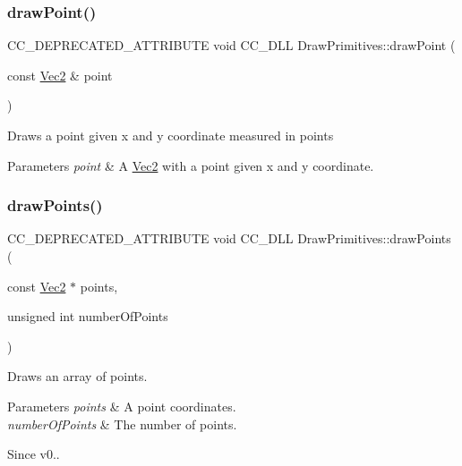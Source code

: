 \subsubsection{\texorpdfstring{draw\+Point()}{drawPoint()}}
{\footnotesize\ttfamily C\+C\+\_\+\+D\+E\+P\+R\+E\+C\+A\+T\+E\+D\+\_\+\+A\+T\+T\+R\+I\+B\+U\+TE void C\+C\+\_\+\+D\+LL Draw\+Primitives\+::draw\+Point (\begin{DoxyParamCaption}\item[{const \hyperlink{classVec2}{Vec2} \&}]{point }\end{DoxyParamCaption})}

Draws a point given x and y coordinate measured in points


\begin{DoxyParams}{Parameters}
{\em point} & A \hyperlink{classVec2}{Vec2} with a point given x and y coordinate. \\
\hline
\end{DoxyParams}
\mbox{\label{namespaceDrawPrimitives_a69ac036b04c0dd7b20643a777bfdde14}} 
\subsubsection{\texorpdfstring{draw\+Points()}{drawPoints()}}
{\footnotesize\ttfamily C\+C\+\_\+\+D\+E\+P\+R\+E\+C\+A\+T\+E\+D\+\_\+\+A\+T\+T\+R\+I\+B\+U\+TE void C\+C\+\_\+\+D\+LL Draw\+Primitives\+::draw\+Points (\begin{DoxyParamCaption}\item[{const \hyperlink{classVec2}{Vec2} $\ast$}]{points,  }\item[{unsigned int}]{number\+Of\+Points }\end{DoxyParamCaption})}

Draws an array of points.


\begin{DoxyParams}{Parameters}
{\em points} & A point coordinates. \\
\hline
{\em number\+Of\+Points} & The number of points. \\
\hline
\end{DoxyParams}
\begin{DoxySince}{Since}
v0.. 
\end{DoxySince}
\mbox{\label{namespaceDrawPrimitives_a71a680302a9b336b8ddb39bf5b18348c}} 
